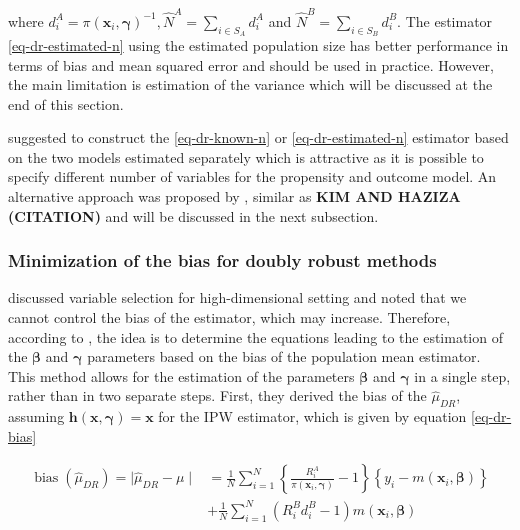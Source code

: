 \documentclass[
]{jss}
\begin{document}
where
\(d_i^A=\pi\left(\boldsymbol{x}_i, \boldsymbol{\gamma}\right)^{-1}, \hat{N}^A=\sum_{i \in S_A} d_i^A\)
and \(\hat{N}^B=\sum_{i \in S_B} d_i^B\). The estimator
\eqref{eq-dr-estimated-n} using the estimated population size has better
performance in terms of bias and mean squared error and should be used
in practice. However, the main limitation is estimation of the variance
which will be discussed at the end of this section.

\citet{chen2020doubly} suggested to construct the \eqref{eq-dr-known-n}
or \eqref{eq-dr-estimated-n} estimator based on the two models estimated
separately which is attractive as it is possible to specify different
number of variables for the propensity and outcome model. An alternative
approach was proposed by \citet{yang_doubly_2020}, similar as
\textbf{KIM AND HAZIZA (CITATION)} and will be discussed in the next
subsection.

\subsubsection{Minimization of the bias for doubly robust
methods}\label{minimization-of-the-bias-for-doubly-robust-methods}

\citet{yang_doubly_2020} discussed variable selection for
high-dimensional setting and noted that we cannot control the bias of
the estimator, which may increase. Therefore, according to
\citet{yang_doubly_2020}, the idea is to determine the equations leading
to the estimation of the \(\boldsymbol{\beta}\) and
\(\boldsymbol{\gamma}\) parameters based on the bias of the population
mean estimator. This method allows for the estimation of the parameters
\(\boldsymbol{\beta}\) and \(\boldsymbol{\gamma}\) in a single step,
rather than in two separate steps. First, they derived the bias of the
\(\hat{\mu}_{DR}\), assuming
\(\boldsymbol{h}(\boldsymbol{x}, \boldsymbol{\gamma})=\boldsymbol{x}\)
for the IPW estimator, which is given by equation \eqref{eq-dr-bias}

\begin{equation}
\begin{aligned}
\operatorname{bias}\left(\hat{\mu}_{D R}\right) = \mid\hat{\mu}_{DR}-\mu\mid &=\frac{1}{N} \sum_{i=1}^N\left\{\frac{R_i^A}{\pi\left(\boldsymbol{x}_i, \boldsymbol{\gamma}\right)} - 1\right\}\left\{y_i-m\left(\boldsymbol{x}_i, \boldsymbol{\beta}\right)\right\}\\
& + \frac{1}{N} \sum_{i=1}^N\left(R_i^B d_i^B-1\right) m\left(\boldsymbol{x}_i, \boldsymbol{\beta}\right)
\end{aligned}
\label{eq-dr-bias}
\end{equation}
\end{document}
